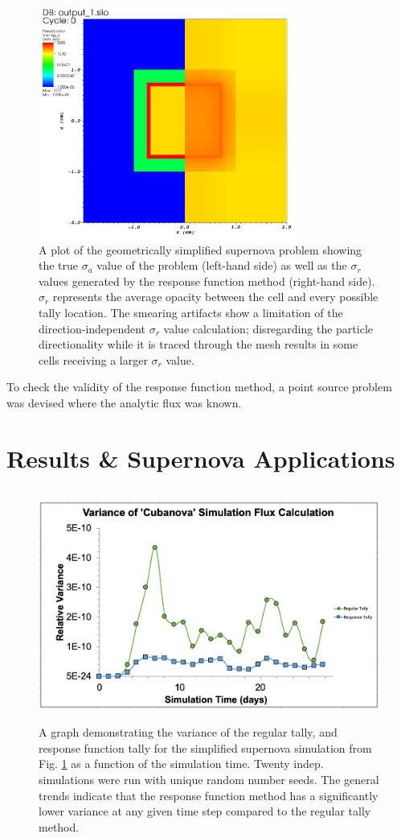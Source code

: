 \documentclass[]{article}
\begin{document}
	\begin{figure} [h!]
		\centering
		\includegraphics[height=3in]{Figures/cubanova_op_a.png}
		\caption{A plot of the geometrically simplified supernova problem showing the true $\sigma_{a}$ value of the problem (left-hand side) as well as the $\sigma_{r}$ values generated by the response function method (right-hand side). $\sigma_{r}$  represents the average opacity between the cell and every possible tally location. The smearing artifacts show a limitation of the direction-independent $\sigma_{r}$ value calculation; disregarding the  particle directionality while it is traced through the mesh results in some cells receiving a larger $\sigma_{r}$ value.}
		\label{fig:cubanova_op_a}
	\end{figure}

	To check the validity of the response function method, a point source problem was devised where the analytic flux was known.

\section{Results \& Supernova Applications}
	\begin{figure} [h!]
		\centering
		\includegraphics[height=3in]{Figures/cubanova_flux_var.png}
		\caption{A graph demonstrating the variance of the regular tally, and response function tally for the simplified supernova simulation from Fig. \ref{fig:cubanova_op_a} as a function of the simulation time. Twenty indep. simulations were run with unique random number seeds. The general trends indicate that the response function method has a significantly lower variance at any given time step compared to the regular tally method.}
		\label{fig:cubanova_flux_var}
	\end{figure}
	
\end{document}
